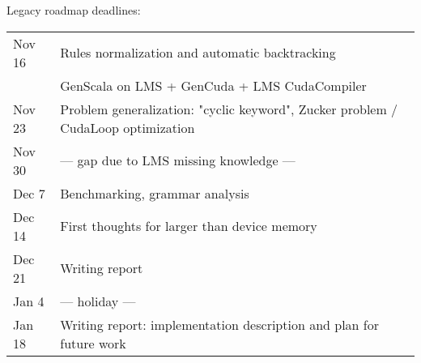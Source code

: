 \documentclass[11pt]{article}
\begin{document}
Legacy roadmap deadlines: \\
\begin{tabular}{ll}
Nov 16 & Rules normalization and automatic backtracking \\
	& GenScala on LMS + GenCuda + LMS CudaCompiler \\
Nov 23 & Problem generalization: "cyclic keyword", Zucker problem / CudaLoop optimization \\
Nov 30 &--- gap due to LMS missing knowledge --- \\
Dec 7 & Benchmarking, grammar analysis \\
Dec 14 & First thoughts for larger than device memory \\
Dec 21 & Writing report \\
Jan 4 & --- holiday --- \\
Jan 18 & Writing report: implementation description and plan for future work
\end{tabular}
\end{document}
